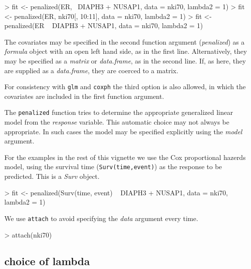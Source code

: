 \documentclass[a4paper]{article}
\newcommand{\Robject}[1]{{\texttt{#1}}}
\newcommand{\Rfunction}[1]{{\texttt{#1}}}
\newcommand{\Rclass}[1]{{\textit{#1}}}
\newcommand{\Rfunarg}[1]{{\textit{#1}}}
\begin{document}
\begin{Schunk}
\begin{Sinput}
> fit <- penalized(ER, ~DIAPH3 + NUSAP1, data = nki70, lambda2 = 1)
> fit <- penalized(ER, nki70[, 10:11], data = nki70, lambda2 = 1)
> fit <- penalized(ER ~ DIAPH3 + NUSAP1, data = nki70, lambda2 = 1)
\end{Sinput}
\end{Schunk}

The covariates may be specified in the second function argument (\Rfunarg{penalized}) as a \Rclass{formula} object with an open left hand side, as in the first line. Alternatively, they may be specified as a \Rclass{matrix} or \Rclass{data.frame}, as in the second line. If, as here, they are supplied as a \Rclass{data.frame}, they are coerced to a matrix.

For consistency with \Rfunction{glm} and \Rfunction{coxph} the third option is also allowed, in which the covariates are included in the first function argument.

The \Rfunction{penalized} function tries to determine the appropriate generalized linear model from the \Rfunarg{response} variable. This automatic choice may not always be appropriate. In such cases the model may be specified explicitly using the \Rfunarg{model} argument.

For the examples in the rest of this vignette we use the Cox proportional hazerds model, using the survival time (\Robject{Surv(time,event)}) as the response to be predicted. This is a \Rclass{Surv} object.

\begin{Schunk}
\begin{Sinput}
> fit <- penalized(Surv(time, event) ~ DIAPH3 + NUSAP1, data = nki70, 
      lambda2 = 1)
\end{Sinput}
\end{Schunk}

We use \Rfunction{attach} to avoid specifying the \Rfunarg{data} argument every time.

\begin{Schunk}
\begin{Sinput}
> attach(nki70)
\end{Sinput}
\end{Schunk}

\subsection{choice of lambda}
\end{document}
